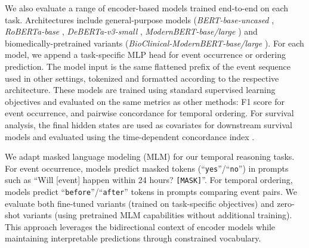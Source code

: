 We also evaluate a range of encoder-based models trained end-to-end on each task. 
Architectures include general-purpose models (\textit{BERT-base-uncased} \citep{devlin2019bert}, \textit{RoBERTa-base} \citep{liu2019roberta}, \textit{DeBERTa-v3-small} \citep{he2021debertav3}, \textit{ModernBERT-base/large} \citep{warner2024smarter}) and biomedically-pretrained variants (\textit{BioClinical-ModernBERT-base/large} \citep{sounack2025bioclinical}).
For each model, we append a task-specific MLP head for event occurrence or ordering prediction. 
The model input is the same flattened prefix of the event sequence used in other settings, tokenized and formatted according to the respective architecture. 
These models are trained using standard supervised learning objectives and evaluated on the same metrics as other methods: F1 score for event occurrence, and pairwise concordance for temporal ordering. 
For survival analysis, the final hidden states are used as covariates for downstream survival models and evaluated using the time-dependent concordance index \citep{ch07:antolini2005time}.

We adapt masked language modeling (MLM) for our temporal reasoning tasks.
For event occurrence, models predict masked tokens (``\texttt{yes}''/``\texttt{no}'') in prompts such as ``Will [event] happen within 24 hours? \texttt{[MASK]}''.
For temporal ordering, models predict ``\texttt{before}''/``\texttt{after}'' tokens in prompts comparing event pairs.
We evaluate both fine-tuned variants (trained on task-specific objectives) and zero-shot variants (using pretrained MLM capabilities without additional training).
This approach leverages the bidirectional context of encoder models while maintaining interpretable predictions through constrained vocabulary.


